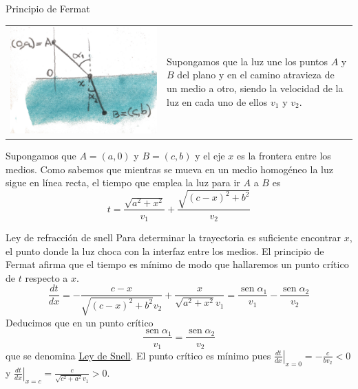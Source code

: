 \documentclass[handout,hyperref={colorlinks=true}]{beamer}
\DeclareMathOperator{\sen}{sen}
\begin{document}
\begin{frame}{Principio de Fermat}
\begin{tabular}{m{4cm} m{5.5cm}}
 \includegraphics[scale=.07]{imagenes/refraccion.jpg} & Supongamos que la luz une los puntos $A$ y $B$ del plano y en el camino atravieza de un medio a otro, siendo la velocidad
 de la luz en cada uno de ellos $v_1$ y $v_2$. 
 \end{tabular}
Supongamos que $A=(a,0)$ y $B=(c,b)$ y el eje $x$ es la frontera entre los medios. Como sabemos que mientras se mueva en un medio homogéneo la luz sigue en línea recta, 
el tiempo que emplea la luz para ir $A$ a $B$ es
 \[t=\frac{\sqrt{a^{2} + x^{2}}}{v_{1}} + \frac{\sqrt{{\left(c - x\right)}^{2} + b^{2}}}{v_{2}}\]
 
\end{frame}

\begin{frame}{Ley de refracción de snell}
Para determinar la trayectoria es suficiente encontrar $x$, el punto donde la luz choca con la interfaz entre los medios. 
El principio de Fermat afirma que el tiempo es mínimo de modo que hallaremos un punto crítico de $t$ respecto a $x$. 
\[ \frac{dt}{dx}=-\frac{c - x}{\sqrt{{\left(c - x\right)}^{2} + b^{2}} v_{2}} +
\frac{x}{\sqrt{a^{2} + x^{2}} v_{1}}=\frac{\sen\alpha_1}{v_1}-\frac{\sen\alpha_2}{v_2} \]
Deducimos que en un punto crítico 
\[\boxed{\frac{\sen\alpha_1}{v_1}=\frac{\sen\alpha_2}{v_2} }\]
que se denomina \href{http://es.wikipedia.org/wiki/Ley_de_Snell}{Ley de Snell}. El punto crítico es mínimo pues $\left.\frac{dt}{dx}\right|_{x=0}=-\tfrac{c}{bv_2}<0$ y
$\left.\frac{dt}{dx}\right|_{x=c}=\tfrac{c}{\sqrt{c^2+a^2}v_1}>0$.

 
\end{frame}
\end{document}
